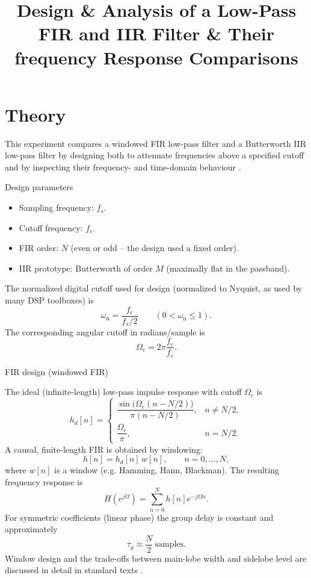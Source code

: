 \documentclass[11pt]{article}
\title{Design \& Analysis of a Low-Pass FIR and IIR Filter \& Their frequency Response Comparisons}
\author{}
\date{}
\begin{document}


\pagebreak

\tableofcontents

\pagebreak
{}
\maketitle

\section*{Theory}
\noindent This experiment compares a windowed FIR low-pass filter and a Butterworth IIR low-pass filter by designing both to attenuate frequencies above a specified cutoff and by inspecting their frequency- and time-domain behaviour \cite{oppenheim1999,proakis2006}.

\bigskip

\noindent Design parameters
\begin{itemize}
    \item Sampling frequency: $f_s$.
    \item Cutoff frequency: $f_\mathrm{c}$.
    \item FIR order: $N$ (even or odd -- the design used a fixed order).
    \item IIR prototype: Butterworth of order $M$ (maximally flat in the passband).
\end{itemize}
The normalized digital cutoff used for design (normalized to Nyquist, as used by many DSP toolboxes) is
\[
    \omega_\mathrm{n} = \frac{f_\mathrm{c}}{f_s/2}\qquad (0<\omega_\mathrm{n}\le 1).
\]
The corresponding angular cutoff in radians/sample is
\[
    \Omega_\mathrm{c} = 2\pi\frac{f_\mathrm{c}}{f_s}.
\]

\bigskip

\noindent FIR design (windowed FIR)

The ideal (infinite-length) low-pass impulse response with cutoff $\Omega_\mathrm{c}$ is
\[
    h_d[n] = \begin{cases}
        \dfrac{\sin\big(\Omega_\mathrm{c}(n - N/2)\big)}{\pi (n - N/2)}, & n\neq N/2, \\[6pt]
        \dfrac{\Omega_\mathrm{c}}{\pi},                                  & n = N/2.
    \end{cases}
\]
A causal, finite-length FIR is obtained by windowing:
\[
    h[n] = h_d[n]\,w[n],\qquad n=0,\dots,N,
\]
where $w[n]$ is a window (e.g. Hamming, Hann, Blackman). The resulting frequency response is
\[
    H(e^{j\Omega}) = \sum_{n=0}^{N} h[n] e^{-j\Omega n}.
\]
For symmetric coefficients (linear phase) the group delay is constant and approximately
\[
    \tau_g \approx \frac{N}{2}\ \text{samples}.
\]
Window design and the trade-offs between main-lobe width and sidelobe level are discussed in detail in standard texts \cite{oppenheim1999,lyons2011}.
\end{document}

